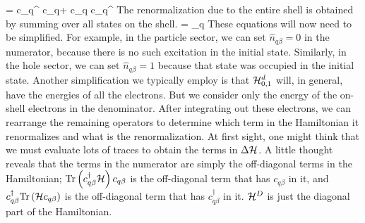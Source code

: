 \documentclass[12pt,twoside]{report}
\numberwithin{equation}{section}
\begin{document}
\beq
\Delta \ham = c_{q\beta}^\dagger {}  c_{q\beta}+  c_{q\beta} c_{q\beta}^\dagger{}
\eeq
The renormalization due to the entire shell is obtained by summing over all states on the shell.
\beq[delta]
\Delta \ham = \sum_{q\beta} 
\eeq
These equations will now need to be simplified. For example, in the particle sector, we can set \(\hat n_{q\beta}=0\) in the numerator, because there is no such excitation in the initial state. Similarly, in  the hole sector, we can set \(\hat n_{q\beta}=1\) because that state was occupied in the initial state. Another simplification we typically employ is that \(\mathcal{H}^d_{0,1}\) will, in general, have the energies of all the electrons. But we consider only the energy of the on-shell electrons in the denominator. After integrating out these electrons, we can rearrange the remaining operators to determine which term in the Hamiltonian it renormalizes and what is the renormalization.
\pb At first sight, one might think that we must evaluate lots of traces to obtain the terms in \(\Delta \mathcal{H}\). A little thought reveals that the terms in the numerator are simply the off-diagonal terms in the Hamiltonian; \(\text{Tr}\left({c^\dagger_{q\beta}\mathcal{H} }\right)c_{q\beta}\) is the off-diagonal term that has \(c_{q\beta}\) in it, and \(c_{q\beta}^\dagger \text{Tr}\left({\mathcal{H} c_{q\beta}}\right)\) is the off-diagonal term that has \(c^\dagger_{q\beta}\) in it. \(\mathcal{H}^D\) is just the diagonal part of the Hamiltonian.
\end{document}
